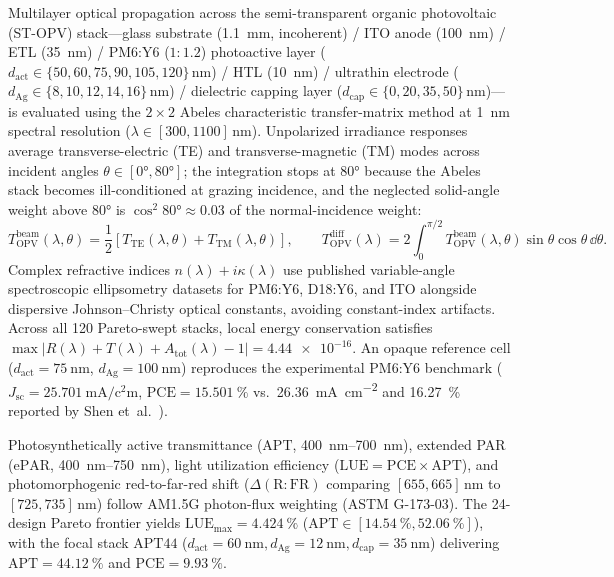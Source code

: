 \documentclass[preprint,12pt,a4paper]{elsarticle}
\begin{document}
Multilayer optical propagation across the semi-transparent organic photovoltaic (ST-OPV) stack---glass substrate (\qty{1.1}{\milli\meter}, incoherent) / ITO anode (\qty{100}{\nano\meter}) /  ETL (\qty{35}{\nano\meter}) / PM6:Y6 ($1{:}1.2$) photoactive layer ($d_{\mathrm{act}} \in \{50, 60, 75, 90, 105, 120\}\,\unit{\nano\meter}$) /  HTL (\qty{10}{\nano\meter}) / ultrathin  electrode ($d_{\mathrm{Ag}} \in \{8, 10, 12, 14, 16\}\,\unit{\nano\meter}$) /  dielectric capping layer ($d_{\mathrm{cap}} \in \{0, 20, 35, 50\}\,\unit{\nano\meter}$)---is evaluated using the $2\times 2$ Abeles characteristic transfer-matrix method at \qty{1}{\nano\meter} spectral resolution ($\lambda \in [\num{300}, \num{1100}]\,\unit{\nano\meter}$). Unpolarized irradiance responses average transverse-electric (TE) and transverse-magnetic (TM) modes across incident angles $\theta \in [\ang{0}, \ang{80}]$; the integration stops at \ang{80} because the Abeles stack becomes ill-conditioned at grazing incidence, and the neglected solid-angle weight above \ang{80} is $\cos^2\ang{80}\approx\num{0.03}$ of the normal-incidence weight:
\begin{equation}
 T_{\mathrm{OPV}}^{\mathrm{beam}}(\lambda,\theta) = \frac{1}{2}\left[T_{\mathrm{TE}}(\lambda,\theta) + T_{\mathrm{TM}}(\lambda,\theta)\right], \qquad
 T_{\mathrm{OPV}}^{\mathrm{diff}}(\lambda) = 2 \int_0^{\pi/2} T_{\mathrm{OPV}}^{\mathrm{beam}}(\lambda,\theta)\sin\theta\cos\theta\,\dd\theta.
 \label{eq:tmm_diff}
\end{equation}
Complex refractive indices $n(\lambda)+i\kappa(\lambda)$ use published variable-angle spectroscopic ellipsometry datasets for PM6:Y6, D18:Y6, and ITO alongside dispersive Johnson--Christy  optical constants, avoiding constant-index artifacts. Across all \num{120} Pareto-swept stacks, local energy conservation satisfies $\max |R(\lambda) + T(\lambda) + A_{\mathrm{tot}}(\lambda) - 1| = \num{4.44e-16}$. An opaque reference cell ($d_{\mathrm{act}}=\qty{75}{\nano\meter}$, $d_{\mathrm{Ag}}=\qty{100}{\nano\meter}$) reproduces the experimental PM6:Y6 benchmark ($J_{\mathrm{sc}}=\qty{25.701}{\milli\ampere\per\square\centi\meter}$, $\mathrm{PCE}=\qty{15.501}{\percent}$ vs.\ \qty{26.36}{\milli\ampere\per\square\centi\meter} and \qty{16.27}{\percent} reported by Shen et~al.~\cite{Shen2025NatCommun}).

Photosynthetically active transmittance ($\mathrm{APT}$, \qtyrange{400}{700}{\nano\meter}), extended PAR ($\mathrm{ePAR}$, \qtyrange{400}{750}{\nano\meter}), light utilization efficiency ($\mathrm{LUE} = \mathrm{PCE}\times \mathrm{APT}$), and photomorphogenic red-to-far-red shift ($\Delta(\mathrm{R{:}FR})$ comparing $[\num{655}, \num{665}]\,\unit{\nano\meter}$ to $[\num{725}, \num{735}]\,\unit{\nano\meter}$) follow AM1.5G photon-flux weighting (ASTM G-173-03). The 24-design Pareto frontier yields $\mathrm{LUE}_{\max}=\qty{4.424}{\percent}$ ($\mathrm{APT}\in [\qty{14.54}{\percent}, \qty{52.06}{\percent}]$), with the focal stack $\mathrm{APT44}$ ($d_{\mathrm{act}}=\qty{60}{\nano\meter}, d_{\mathrm{Ag}}=\qty{12}{\nano\meter}, d_{\mathrm{cap}}=\qty{35}{\nano\meter}$) delivering $\mathrm{APT}=\qty{44.12}{\percent}$ and $\mathrm{PCE}=\qty{9.93}{\percent}$.
\end{document}
